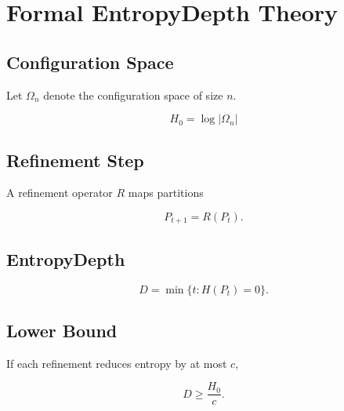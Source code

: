 \chapter{Formal EntropyDepth Theory}

\section{Configuration Space}

Let \(\Omega_n\) denote the configuration space of size \(n\).

\[
H_0 = \log |\Omega_n|
\]

\section{Refinement Step}

A refinement operator \(R\) maps partitions

\[
P_{t+1} = R(P_t).
\]

\section{EntropyDepth}

\[
D = \min \{t : H(P_t)=0\}.
\]

\section{Lower Bound}

If each refinement reduces entropy by at most \(c\),

\[
D \ge \frac{H_0}{c}.
\]
